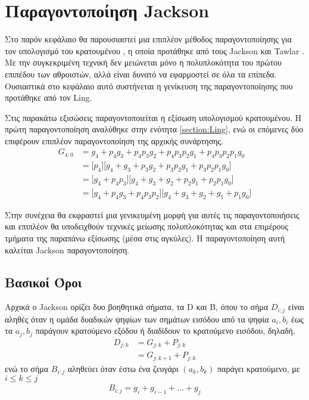 \section{Παραγοντοποίηση Jackson}
\label{section:jackson}
Στο παρόν κεφάλαιο θα παρουσιαστεί μια επιπλέον μέθοδος παραγοντοποίησης 
για τον υπολογισμό του κρατουμένου , η οποία προτάθηκε από τους Jackson και 
Tawlar \cite{1399373}. Με την συγκεκριμένη τεχνική δεν μειώνεται μόνο
η πολυπλοκότητα του πρώτου επιπέδου των αθροιστών, αλλά είναι δυνατό να εφαρμοστεί σε όλα τα επίπεδα.
Ουσιαστικά στο κεφάλαιο αυτό συστήνεται η γενίκευση της 
παραγοντοποίησης που προτάθηκε από τον Ling.

Στις παρακάτω εξισώσεις παραγοντοποιείται η εξίσωση υπολογισμού κρατουμένου.
Η πρώτη παραγοντοποίηση αναλύθηκε στην ενότητα \ref{section:Ling},
ενώ οι επόμενες δύο επιφέρουν επιπλέον παραγοντοποίηση της αρχικής συνάρτησης. 
\begin{equation}
\begin{split}
    G_{4:0} &= g_4 + p_4    g_3 + p_4p_3g_2 + p_4p_3p_2g_1 + p_4p_3p_2p_1g_0 \\
            &= \Big[p_4\Big]\Big[g_4 + g_3 +p_3g_2 + p_3p_2g_1 + p_3p_2p_1g_0\Big] \\
            &=\Big[g_4 + p_4p_3\Big]\Big[g_4 + g_3 + g_2 + p_2g_1 + p_2p_1g_0\Big] \\
            &= \Big[g_4 +  p_4g_3 + p_4p_3p_2 \Big]\Big[ g_4 + g_3 + g_2 + g_1 + p_1g_0 \Big]
\end{split}
\label{jacskon_basic_eq_idea}
\end{equation}

Στην συνέχεια θα εκφραστεί μια γενικευμένη μορφή για αυτές τις παραγοντοποιήσεις και επιπλέον
θα υποδειχθούν τεχνικές μείωσης πολυπλοκότητας και στα επιμέρους τμήματα
της παραπάνω εξίσωσης (μέσα στις αγκύλες). Η παραγοντοποίηση αυτή καλείται Jackson παραγοντοποίηση.






\subsection{Βασικοί Όροι}


Αρχικά ο Jackson ορίζει δυο βοηθητικά σήματα, τα D και B,
όπου το σήμα $D_{i:j}$ είναι αληθές όταν η ομάδα δυαδικών ψηφίων των 
σημάτων εισόδου από τα ψηφία $a_i,b_i$ έως τα $a_j,b_j$ παράγουν κρατούμενο
εξόδου ή διαδίδουν το κρατούμενο εισόδου, δηλαδή,
\begin{equation}
\begin{split}
    D_{j:k} &= G_{j:k} + P_{j:k}\\
            &= G_{j:k+1} + P_{j:k}
\end{split}
\end{equation}
ενώ το σήμα $B_{i:j}$ αληθεύει όταν 
έστω ένα ζευγάρι $(a_k,b_k)$ παράγει κρατούμενο, με $i \leq k \leq j$
\begin{equation}
\begin{split}
    B_{i:j} = g_i + g_{i-1} + ... + g_j
\end{split}
\end{equation}

